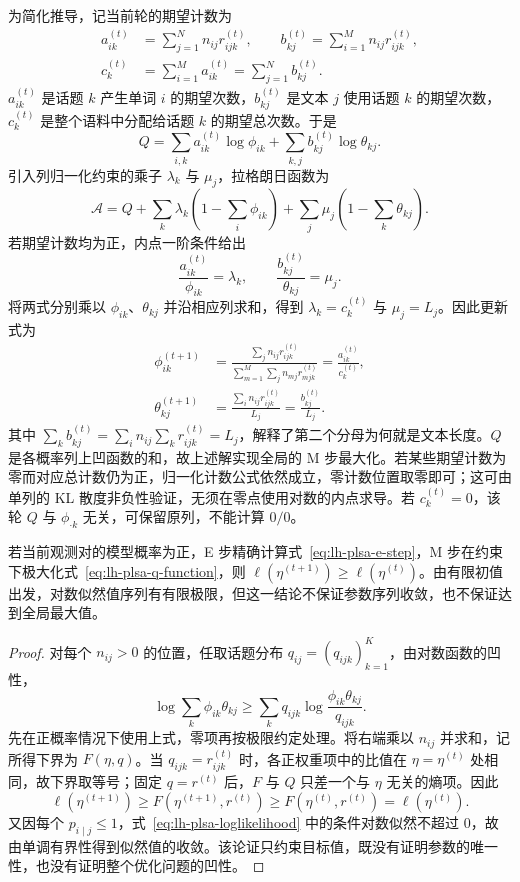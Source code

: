 为简化推导，记当前轮的期望计数为
\begin{equation}
\begin{aligned}
a_{ik}^{(t)}&=\sum_{j=1}^N n_{ij}r_{ijk}^{(t)},\qquad
b_{kj}^{(t)}=\sum_{i=1}^M n_{ij}r_{ijk}^{(t)},\\
c_k^{(t)}&=\sum_{i=1}^M a_{ik}^{(t)}
=\sum_{j=1}^N b_{kj}^{(t)}.
\end{aligned}
\label{eq:lh-plsa-count-statistics}
\end{equation}
$a_{ik}^{(t)}$ 是话题 $k$ 产生单词 $i$ 的期望次数，$b_{kj}^{(t)}$ 是文本 $j$ 使用话题 $k$ 的期望次数，$c_k^{(t)}$ 是整个语料中分配给话题 $k$ 的期望总次数。于是
\[
Q=\sum_{i,k}a_{ik}^{(t)}\log\phi_{ik}
+\sum_{k,j}b_{kj}^{(t)}\log\theta_{kj}.
\]
引入列归一化约束的乘子 $\lambda_k$ 与 $\mu_j$，拉格朗日函数为
\[
\mathcal A=Q+
\sum_k\lambda_k\left(1-\sum_i\phi_{ik}\right)
+\sum_j\mu_j\left(1-\sum_k\theta_{kj}\right).
\]
若期望计数均为正，内点一阶条件给出
\[
\frac{a_{ik}^{(t)}}{\phi_{ik}}=\lambda_k,\qquad
\frac{b_{kj}^{(t)}}{\theta_{kj}}=\mu_j.
\]
将两式分别乘以 $\phi_{ik}$、$\theta_{kj}$ 并沿相应列求和，得到 $\lambda_k=c_k^{(t)}$ 与 $\mu_j=L_j$。因此更新式为
\begin{align}
\phi_{ik}^{(t+1)}
&=\frac{\sum_jn_{ij}r_{ijk}^{(t)}}
{\sum_{m=1}^M\sum_jn_{mj}r_{mjk}^{(t)}}
=\frac{a_{ik}^{(t)}}{c_k^{(t)}},
\label{eq:lh-plsa-m-step-phi}\\
\theta_{kj}^{(t+1)}
&=\frac{\sum_in_{ij}r_{ijk}^{(t)}}{L_j}
=\frac{b_{kj}^{(t)}}{L_j}.
\label{eq:lh-plsa-m-step-theta}
\end{align}
其中 $\sum_kb_{kj}^{(t)}=\sum_in_{ij}\sum_kr_{ijk}^{(t)}=L_j$，解释了第二个分母为何就是文本长度。$Q$ 是各概率列上凹函数的和，故上述解实现全局的 M 步最大化。若某些期望计数为零而对应总计数仍为正，归一化计数公式依然成立，零计数位置取零即可；这可由单列的 KL 散度非负性验证，无须在零点使用对数的内点求导。若 $c_k^{(t)}=0$，该轮 $Q$ 与 $\phi_{\cdot k}$ 无关，可保留原列，不能计算 $0/0$。

\begin{proposition}[EM 的似然单调性]
\label{prop:lh-plsa-em-monotonicity}
若当前观测对的模型概率为正，E 步精确计算式~\eqref{eq:lh-plsa-e-step}，M 步在约束下极大化式~\eqref{eq:lh-plsa-q-function}，则 $\ell(\eta^{(t+1)})\geq\ell(\eta^{(t)})$。由有限初值出发，对数似然值序列有有限极限，但这一结论不保证参数序列收敛，也不保证达到全局最大值。
\end{proposition}
\begin{proof}
对每个 $n_{ij}>0$ 的位置，任取话题分布 $q_{ij}=(q_{ijk})_{k=1}^K$，由对数函数的凹性，
\[
\log\sum_k\phi_{ik}\theta_{kj}
\geq\sum_kq_{ijk}\log\frac{\phi_{ik}\theta_{kj}}{q_{ijk}}.
\]
先在正概率情况下使用上式，零项再按极限约定处理。将右端乘以 $n_{ij}$ 并求和，记所得下界为 $F(\eta,q)$。当 $q_{ijk}=r_{ijk}^{(t)}$ 时，各正权重项中的比值在 $\eta=\eta^{(t)}$ 处相同，故下界取等号；固定 $q=r^{(t)}$ 后，$F$ 与 $Q$ 只差一个与 $\eta$ 无关的熵项。因此
\[
\ell(\eta^{(t+1)})\geq F(\eta^{(t+1)},r^{(t)})
\geq F(\eta^{(t)},r^{(t)})=\ell(\eta^{(t)}).
\]
又因每个 $p_{i\mid j}\leq1$，式~\eqref{eq:lh-plsa-loglikelihood} 中的条件对数似然不超过 $0$，故由单调有界性得到似然值的收敛。该论证只约束目标值，既没有证明参数的唯一性，也没有证明整个优化问题的凹性。
\end{proof}

